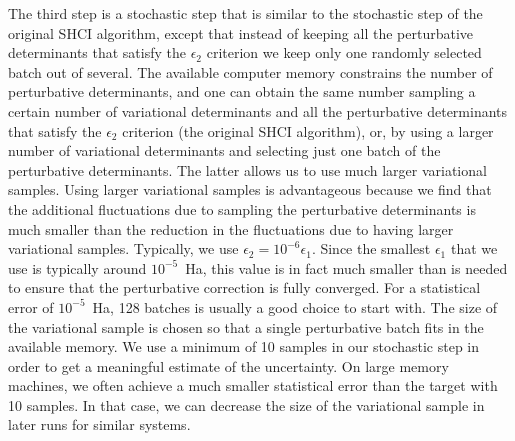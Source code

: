 \documentclass[%
preprint,
 superscriptaddress,
 amsmath,amssymb,
 aps,
]{revtex4-1}
\def\beq{\begin{eqnarray}}
\def\eeq{\end{eqnarray}}
\begin{document}
The third step is a stochastic step that is similar to the stochastic step of the original SHCI algorithm, except that instead of keeping all the perturbative determinants
that satisfy the $\epsilon_2$ criterion we keep only one randomly selected batch out of several.
The available computer memory constrains the number of perturbative determinants, and one can obtain the same number sampling a certain
number of variational determinants and all the perturbative determinants that satisfy the $\epsilon_2$ criterion (the original SHCI algorithm),
or, by using a larger number of variational determinants and selecting just one batch of the perturbative determinants.
The latter allows us to use much larger variational samples.
Using larger variational samples is advantageous because we find that the additional fluctuations
due to sampling the perturbative determinants is much smaller than the reduction in the fluctuations due to having larger variational samples.
Typically, we use $\epsilon_2 = 10^{-6} \epsilon_{1}$.  Since the smallest $\epsilon_{1}$ that we use is typically around $10^{-5}$~Ha,
this value is in fact much smaller than is needed to ensure that the perturbative correction is fully converged.
For a statistical error of $10^{-5}$~Ha, 128 batches is usually a good choice to start with.
The size of the variational sample is chosen so that a single perturbative batch fits in the available memory.
We use a minimum of 10 samples in our stochastic step in order to get a meaningful estimate of the uncertainty.
On large memory machines, we often achieve a much smaller statistical error than the target with 10 samples.
In that case, we can decrease the size of the variational sample in later runs for similar systems.
\end{document}
